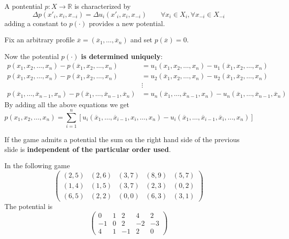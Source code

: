 \documentclass[../main.tex]{subfiles}
\begin{document}
A pontential $p : X \to \mathbb{R}$ is characterized by
\[
    \Delta p (x'_i, x_i, x_{-i}) = \Delta u_i (x'_i, x_i, x_{-i}) \qquad \forall x_i \in X_i, \forall x_{-i} \in X_{-i}
\]
adding a constant to $p(\cdot)$ provides a new potential.

Fix an arbitrary profile $\overline{x} = (\overline{x}_1,\ldots,\overline{x}_n)$ and set $p(\overline{x}) = 0$.

Now the potential $p(\cdot)$ \textbf{is determined uniquely}:
\begin{align*}
    p(x_1, x_2, \ldots, x_n) - p(\overline{x}_1, x_2, \ldots, x_n)                                                     & = u_1(x_1, x_2, \ldots, x_n) - u_1(\overline{x}_1, x_2, \ldots, x_n)                                                     \\
    p(\overline{x}_1, x_2, \ldots, x_n) -p(\overline{x}_1, \overline{x}_2, \ldots, x_n)                                & = u_2(\overline{x}_1, x_2, \ldots, x_n) - u_2(\overline{x}_1, \overline{x}_2, \ldots, x_n)                               \\
                                                                                                                       & \vdots                                                                                                                   \\
    p(\overline{x}_1, \ldots, \overline{x}_{n-1}, x_n) - p(\overline{x}_1, \ldots, \overline{x}_{n-1}, \overline{x}_n) & = u_n(\overline{x}_1, \ldots, \overline{x}_{n-1}, x_n) - u_n(\overline{x}_1, \ldots, \overline{x}_{n-1}, \overline{x}_n)
\end{align*}
By adding all the above equations we get
\[
    p(x_1, x_2, \ldots, x_n) = \sum_{i=1}^n [u_i(\overline{x}_1, \ldots, \overline{x}_{i-1}, x_i, \ldots, x_n) - u_i(\overline{x}_1, \ldots, \overline{x}_{i-1}, \overline{x}_i, \ldots, x_n)]
\]
\begin{note}
    If the game admits a potential the sum on the right hand side of the previous slide is \textbf{independent of the particular order used}.
\end{note}
\begin{example}
    In the following game
    \[
        \begin{pmatrix}
            (2,5) & (2,6) & (3,7) & (8,9) & (5,7) \\
            (1,4) & (1,5) & (3,7) & (2,3) & (0,2) \\
            (6,5) & (2,2) & (0,0) & (6,3) & (3,1)
        \end{pmatrix}
    \]
    The potential is
    \[
        \begin{pmatrix}
            0  & 1 & 2  & 4  & 2  \\
            -1 & 0 & 2  & -2 & -3 \\
            4  & 1 & -1 & 2  & 0
        \end{pmatrix}
    \]
\end{example}
\end{document}
